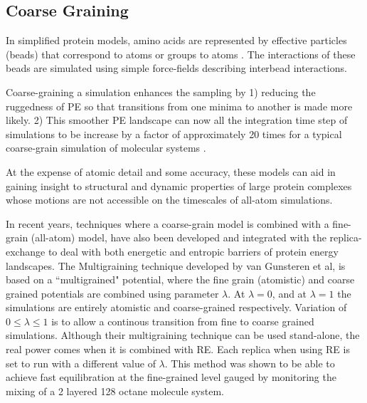 \documentclass[12pt]{article}
\numberwithin{equation}{subsection}
\begin{document}
\begin{spacing}{1}
\section{Coarse Graining}
In simplified protein models, amino acids are represented by effective particles (beads) that correspond to atoms or groups to atoms \cite{tozz}.  The interactions of these beads are simulated using simple force-fields describing interbead interactions. 

Coarse-graining a simulation enhances the sampling by 1) reducing the ruggedness of PE so that transitions from one minima to another is made more likely. 2) This smoother PE landscape can now all the integration time step of simulations to be increase by a factor of approximately 20 times for a typical coarse-grain simulation of molecular systems \cite{tozz,gunst06}.

At the expense of atomic detail and some accuracy, these models can aid in gaining insight to structural and dynamic properties of large protein complexes whose motions are not accessible on the timescales of all-atom simulations. 

In recent years, techniques where a coarse-grain model is combined with a fine-grain (all-atom) model, have also been developed and integrated with the replica-exchange to deal with both energetic and entropic barriers of protein energy landscapes. The Multigraining technique developed by van Gunsteren et al, \cite{multigrain} is based on a ``multigrained" potential, where the fine grain (atomistic) and coarse grained potentials are combined using parameter $\lambda$. At $\lambda=0$,  and at $\lambda=1$ the simulations are entirely atomistic and coarse-grained respectively. 
Variation of $0 \leq \lambda \leq 1$ is to allow a continous transition from fine to coarse grained simulations.  Although their multigraining technique can be used stand-alone, the real power comes when it is combined with RE. Each replica when using RE is set to run with a different value of $\lambda$. This method was shown to be able to achieve fast equilibration at the fine-grained level gauged by monitoring the mixing of a 2 layered 128 octane molecule system.


\end{spacing}
\end{document}
